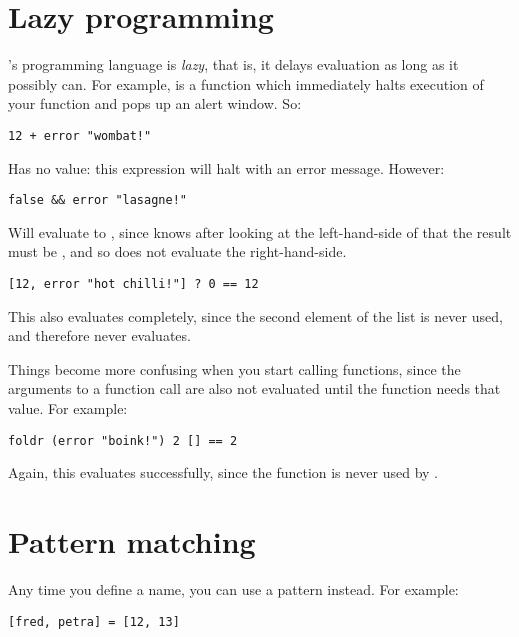 \section{Lazy programming}

\nip{}'s programming language is \emph{lazy}, that is, it delays evaluation
as long as it possibly can.  For example,  is a function which 
immediately halts execution of your function and pops up an alert window. So:

\begin{verbatim}
12 + error "wombat!"
\end{verbatim}

\noindent
Has no value: this expression will halt with an error message. However:

\begin{verbatim}
false && error "lasagne!"
\end{verbatim}

\noindent
Will evaluate to , since \nip{} knows after looking at the
left-hand-side of \ct{\&\&} that the result must be , and so does
not evaluate the right-hand-side.

\begin{verbatim}
[12, error "hot chilli!"] ? 0 == 12
\end{verbatim}

\noindent
This also evaluates completely, since the second element of the list is never
used, and therefore never evaluates.

Things become more confusing when you start calling functions, since the
arguments to a function call are also not evaluated until the function needs
that value. For example:

\begin{verbatim}
foldr (error "boink!") 2 [] == 2
\end{verbatim}

\noindent
Again, this evaluates successfully, since the function is never used by
.

\section{Pattern matching}

Any time you define a name, you can use a pattern instead. For example:

\begin{verbatim}
[fred, petra] = [12, 13]
\end{verbatim}

